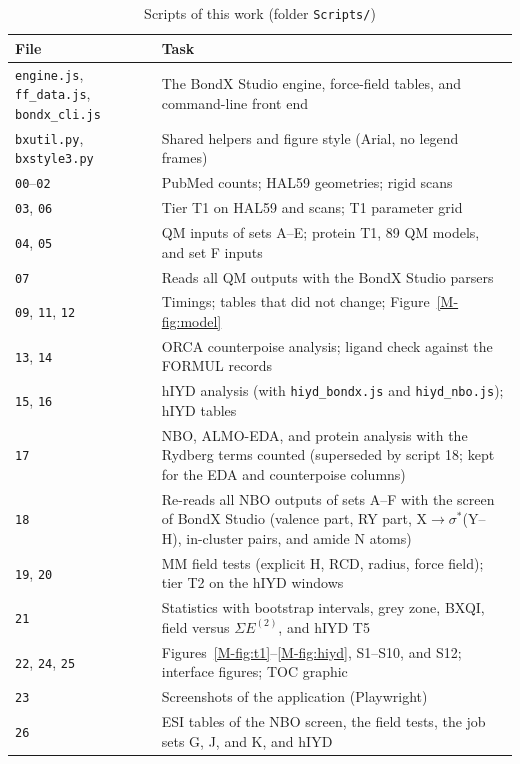 \documentclass[journal=jcisd8,manuscript=suppinfo]{achemso}
\newcommand{\ET}{E^{(2)}}
\newcommand{\BX}{BondX Studio}
\begin{document}
\begin{singlespace}
\begin{table}[!htbp]
\caption{Scripts of this work (folder \texttt{Scripts/})}
\label{tab:scripts}
\centering\footnotesize
\begin{tabularx}{\textwidth}{@{}>{\raggedright\arraybackslash}p{5.4cm}>{\raggedright\arraybackslash}X@{}}
\toprule
File & Task \\
\midrule
\texttt{engine.js}, \texttt{ff\_data.js}, \texttt{bondx\_cli.js} & The \BX{} engine, force-field tables, and command-line front end \\
\texttt{bxutil.py}, \texttt{bxstyle3.py} & Shared helpers and figure style (Arial, no legend frames) \\
\texttt{00}--\texttt{02} & PubMed counts; HAL59 geometries; rigid scans \\
\texttt{03}, \texttt{06} & Tier T1 on HAL59 and scans; T1 parameter grid \\
\texttt{04}, \texttt{05} & QM inputs of sets A--E; protein T1, 89 QM models, and set F inputs \\
\texttt{07} & Reads all QM outputs with the \BX{} parsers \\
\texttt{09}, \texttt{11}, \texttt{12} & Timings; tables that did not change; Figure~\ref{M-fig:model} \\
\texttt{13}, \texttt{14} & ORCA counterpoise analysis; ligand check against the FORMUL records \\
\texttt{15}, \texttt{16} & hIYD analysis (with \texttt{hiyd\_bondx.js} and \texttt{hiyd\_nbo.js}); hIYD tables \\
\texttt{17} & NBO, ALMO-EDA, and protein analysis with the Rydberg terms counted (superseded by script 18; kept for the EDA and counterpoise columns) \\
\texttt{18} & Re-reads all NBO outputs of sets A--F with the screen of \BX{} (valence part, RY part, X$\to\sigma^*$(Y--H), in-cluster pairs, and amide N atoms) \\
\texttt{19}, \texttt{20} & MM field tests (explicit H, RCD, radius, force field); tier T2 on the hIYD windows \\
\texttt{21} & Statistics with bootstrap intervals, grey zone, BXQI, field versus $\Sigma\ET$, and hIYD T5 \\
\texttt{22}, \texttt{24}, \texttt{25} & Figures~\ref{M-fig:t1}--\ref{M-fig:hiyd}, S1--S10, and S12; interface figures; TOC graphic \\
\texttt{23} & Screenshots of the application (Playwright) \\
\texttt{26} & ESI tables of the NBO screen, the field tests, the job sets G, J, and K, and hIYD \\

\end{tabularx}
\end{table}
\end{singlespace}
\end{document}
